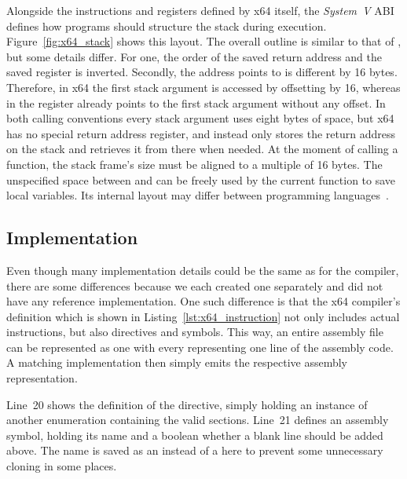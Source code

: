 Alongside the instructions and registers defined by x64 itself, the \emph{System~V} ABI defines how programs should structure the stack during execution.
Figure~\ref{fig:x64_stack} shows this layout.
The overall outline is similar to that of \riscv{}, but some details differ.
For one, the order of the saved return address and the saved  register is inverted.
Secondly, the address  points to is different by 16 bytes.
Therefore, in x64 the first stack argument is accessed by offsetting  by 16, whereas in \riscv{} the  register already points to the first stack argument without any offset.
In both calling conventions every stack argument uses eight bytes of space, but x64 has no special return address register, and instead only stores the return address on the stack and retrieves it from there when needed.
At the moment of calling a function, the stack frame's size must be aligned to a multiple of 16 bytes.
The unspecified space between  and  can be freely used by the current function to save local variables.
Its internal layout may differ between programming languages~\cite[p.~21]{Lu2022}.

\subsection{Implementation}


Even though many implementation details could be the same as for the \riscv{} compiler, there are some differences because we each created one separately and did not have any reference implementation.
One such difference is that the x64 compiler's  definition which is shown in Listing~\ref{lst:x64_instruction} not only includes actual instructions, but also directives and symbols.
This way, an entire assembly file can be represented as one  with every  representing one line of the assembly code.
A matching  implementation then simply emits the respective assembly representation.

Line~20 shows the definition of the  directive, simply holding an instance of another enumeration containing the valid sections.
Line~21 defines an assembly symbol, holding its name and a boolean whether a blank line should be added above.
The name is saved as an  instead of a  here to prevent some unnecessary cloning in some places.

